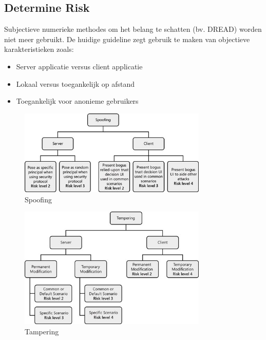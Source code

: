 \documentclass[../main.tex]{subfiles}
\begin{document}
\subsection{Determine Risk}
Subjectieve numerieke methodes om het belang te schatten (bv. DREAD) worden niet meer gebruikt. De huidige guideline zegt gebruik te maken van objectieve karakteristieken zoals:
\begin{itemize}
	\item Server applicatie versus client applicatie
	\item Lokaal versus toegankelijk op afstand
	\item Toegankelijk voor anonieme gebruikers
\end{itemize}

\begin{figure}[h!]
    \centering
    \includegraphics[width=0.8\textwidth]{../images/spoofing.png}
    \caption{Spoofing}
    \label{spoofing}
\end{figure}

\begin{figure}[h!]
    \centering
    \includegraphics[width=0.8\textwidth]{../images/tampering.png}
    \caption{Tampering}
    \label{tampering}
\end{figure}
    
\end{document}
